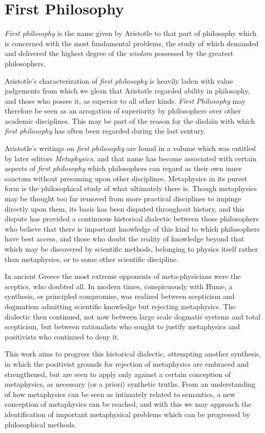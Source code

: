 \section{First Philosophy}

{\it First philosophy} is the name given by Aristotle to that part of philosophy which is concerned with the most fundamental problems, the study of which demanded and delivered the highest degree of the {\it wisdom} possessed by the greatest philosophers.

Aristotle's characterization of {\it first philosophy} is heavily laden with value judgements from which we glean that Aristotle regarded ability in philosophy, and those who posses it, as superior to all other kinds.
{\it First Philosophy} may therefore be seen as an arrogation of superiority by philosophers over other academic disciplines.
This may be part of the reason for the disdain with which {\it first philosophy} has often been regarded during the last century.

Aristotle's writings on {\it first philosophy} are found in a volume which was entitled by later editors {\it Metaphysics}, and that name has become associated with certain aspects of {\it first philosophy} which philosophers can regard as their own inner sanctum without presuming upon other disciplines.
Metaphysics in its purest form is the philosophical study of what ultimately there is.
Though metaphysics may be thought too far removed from more practical disciplines to impinge directly upon them, its basis has been disputed throughout history, and this dispute has provided a continuous historical dialectic between those philosophers who believe that there is important knowledge of this kind to which philosophers have best access, and those who doubt the reality of knowledge beyond that which may be discovered by scientific methods, belonging to physics itself rather than metaphysics, or to some other scientific discipline.

In ancient Greece the most extreme opponents of meta-physicians were the sceptics, who doubted all.
In modern times, conspicuously with Hume, a synthesis, or principled compromise, was realized between scepticism and dogmatism admitting scientific knowledge but rejecting metaphysics.
The dialectic then continued, not now between large scale dogmatic systems and total scepticism, but between rationalists who sought to justify metaphysics and positivists who continued to deny it.

This work aims to progress this historical dialectic, attempting another synthesis, in which the positivist grounds for rejection of metaphysics are embraced and strengthened, but are seen to apply only against a certain conception of metaphysics, as necessary (or a priori) synthetic truths.
From an understanding of how metaphysics can be seen as intimately related to semantics, a new conception of metaphysics can be reached, and with this we may approach the identification of important metaphysical problems  which can be progressed by philosophical methods.

